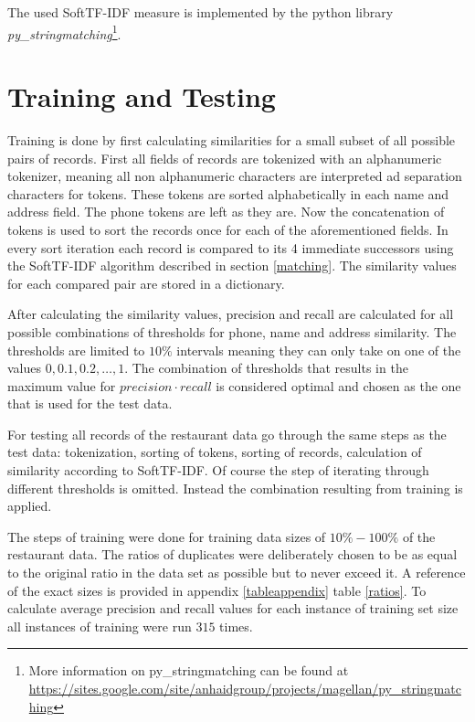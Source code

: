 \documentclass[conference]{IEEEtran}
\begin{document}
The used SoftTF-IDF measure is implemented by the python library \emph{py\_stringmatching}\footnote{More information on py\_stringmatching  can be found at \url{https://sites.google.com/site/anhaidgroup/projects/magellan/py\_stringmatching}}.

\section{Training and Testing}\label{training}
Training is done by first calculating similarities for a small subset of all possible pairs of records. First all fields of records are tokenized with an alphanumeric tokenizer, meaning all non alphanumeric characters are interpreted ad separation characters for tokens. These tokens are sorted alphabetically in each name and address field. The phone tokens are left as they are. Now the concatenation of tokens is used to sort the records once for each of the aforementioned fields. In every sort iteration each record is compared to its 4 immediate successors using the SoftTF-IDF algorithm described in section \ref{matching}. The similarity values for each compared pair are stored in a dictionary.

After calculating the similarity values, precision and recall are calculated for all possible combinations of thresholds for phone, name and address similarity. The thresholds are limited to $10\%$ intervals meaning they can only take on one of the values $0, 0.1, 0.2, \dots, 1$.
The combination of thresholds that results in the maximum value for $precision \cdot recall$ is considered optimal and chosen as the one that is used for the test data.

For testing all records of the restaurant data go through the same steps as the test data: tokenization, sorting of tokens, sorting of records, calculation of similarity according to SoftTF-IDF. Of course the step of iterating through different thresholds is omitted. Instead the combination resulting from training is applied. 

The steps of training were done for training data sizes of $ 10\% - 100\%$ of the restaurant data. The ratios of duplicates were deliberately chosen to be as equal to the original ratio in the data set as possible but to never exceed it. A reference of the exact sizes is provided in appendix \ref{tableappendix} table \ref{ratios}. To calculate average precision and recall values for each instance of training set size all instances of training were run $315$ times.
\end{document}
